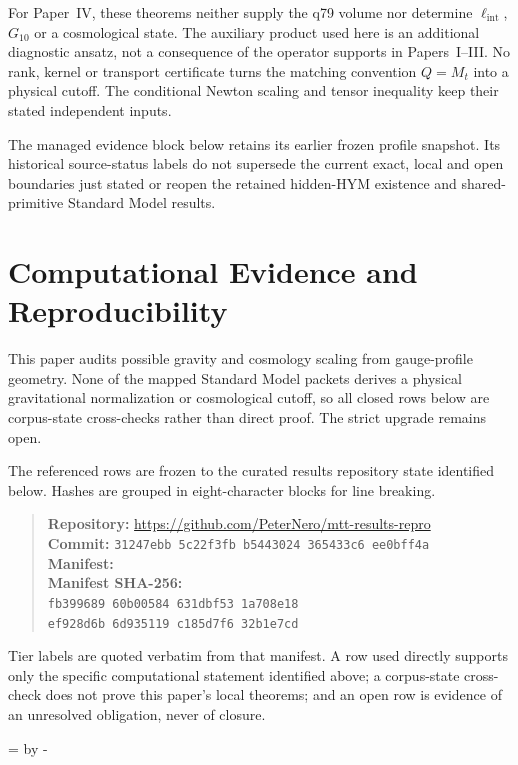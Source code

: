 \documentclass[11pt]{article}
\begin{document}
For Paper~IV, these theorems neither supply the q79 volume nor determine
$\ell_{\mathrm{int}}$, $G_{10}$ or a cosmological state. The auxiliary product
used here is an additional diagnostic ansatz, not a consequence of the
operator supports in Papers~I--III. No rank, kernel or transport certificate
turns the matching convention $Q=M_t$ into a physical cutoff. The conditional
Newton scaling and tensor inequality keep their stated independent inputs.


The managed evidence block below retains its earlier frozen profile snapshot.
Its historical source-status labels do not supersede the current exact,
local and open boundaries just stated or reopen the retained hidden-HYM
existence and shared-primitive Standard Model results.

\section*{Computational Evidence and Reproducibility}
This paper audits possible gravity and cosmology scaling from gauge-profile geometry. None of the mapped Standard Model packets derives a physical gravitational normalization or cosmological cutoff, so all closed rows below are corpus-state cross-checks rather than direct proof. The strict upgrade remains open.

The referenced rows are frozen to the curated results repository state identified below. Hashes are grouped in eight-character blocks for line breaking.
\begin{quote}\small
\textbf{Repository:} \url{https://github.com/PeterNero/mtt-results-repro}\\
\textbf{Commit:} \texttt{31247ebb 5c22f3fb b5443024 365433c6 ee0bff4a}\\
\textbf{Manifest:} \\
\textbf{Manifest SHA-256:}\\
\texttt{fb399689 60b00584 631dbf53 1a708e18}\\
\texttt{ef928d6b 6d935119 c185d7f6 32b1e7cd}
\end{quote}

Tier labels are quoted verbatim from that manifest. A row used directly supports only the specific computational statement identified above; a corpus-state cross-check does not prove this paper's local theorems; and an open row is evidence of an unresolved obligation, never of closure.

\par\begingroup{}=\pagegoal\advance{} by -\pagetotal\ifdim\dimen0<7\baselineskip\newpage\fi\endgroup
\end{document}
